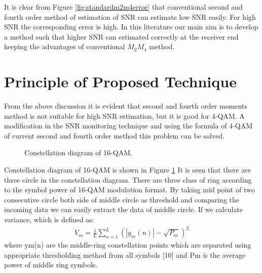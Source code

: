 \documentclass[12pt]{report}
\begin{document}
It is clear from Figure \ref{fig:standardm2m4error} that conventional second and fourth order method of estimation of SNR can estimate low SNR easily. For high SNR the corresponding error is high. In this literature our main aim is to develop a method such that higher SNR can estimated correctly at the receiver end keeping the advantages of conventional $M_2 M_4$ method.

\section{Principle of Proposed Technique}
From the above discussion it is evident that second and fourth order moments method is not suitable for high SNR estimation, but it is good for 4-QAM. A modification in the SNR monitoring technique and using the formula of 4-QAM of current second and fourth order method this problem can be solved.
\begin{figure}[htbp]
	\caption{Constellation diagram of 16-QAM.}
	\label{fig:qam16-constallation}
\end{figure}
Constellation diagram of 16-QAM is shown in Figure \ref{fig:qam16-constallation} It is seen that there are three circle in the constellation diagram. There are three class of ring according to the symbol power of 16-QAM modulation format.  By taking mid point of two consecutive circle both side of middle circle as threshold and comparing the incoming data we can easily extract the data of  middle circle. If we calculate variance, which is defined as:
\begin{align}\label{eq:variance}
V_m = \frac{1}{L}\sum_{n=1}^{L}(|y_m (n)|-\sqrt{P_m})^2
\end{align}
where ym(n) are the middle-ring constellation points which are separated using appropriate thresholding method from all symbols [10] and Pm is the average power of middle ring
symbols.
\end{document}
